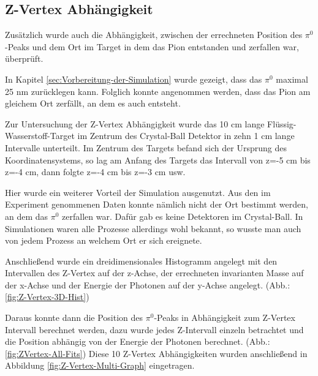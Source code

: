 \documentclass[a4paper,11pt,oneside,final,german,openbib,pdftex]{scrbook}
\begin{document}
{\subsection{Z-Vertex Abh\"angigkeit}
\label{sec:Z-Vertex-Abhaengigkeit}


Zusätzlich wurde auch die Abh\"angigkeit, zwischen der errechneten  Position des $\pi^0$-Peaks und dem Ort im Target in dem das Pion entstanden und zerfallen war, \"uberpr\"uft. 

In Kapitel \ref{sec:Vorbereitung-der-Simulation} wurde gezeigt, dass das $\pi^0$ maximal 25 nm zurücklegen kann. Folglich konnte angenommen werden, dass das Pion am gleichem Ort zerf\"allt, an dem es auch entsteht.

 
Zur Untersuchung der Z-Vertex Abhängigkeit wurde das 10 cm lange Fl\"ussig-Wasserstoff-Target im Zentrum des Crystal-Ball Detektor in zehn 1 cm lange Intervalle unterteilt. 
Im Zentrum des Targets befand sich der Ursprung des Koordinatensystems, so lag am Anfang des Targets das Intervall von z=-5 cm bis z=-4 cm, dann folgte z=-4 cm bis z=-3 cm usw. 

Hier wurde ein weiterer Vorteil der Simulation ausgenutzt. Aus den im Experiment genommenen Daten konnte n\"amlich nicht der Ort bestimmt werden, an dem das $\pi^0$ zerfallen war. Daf\"ur gab es keine Detektoren im Crystal-Ball. In Simulationen waren alle Prozesse allerdings wohl bekannt, so wusste man auch von jedem Prozess an welchem Ort er sich ereignete. 

Anschließend wurde ein dreidimensionales Histogramm angelegt mit den Intervallen des Z-Vertex auf der z-Achse, der errechneten invarianten Masse auf der x-Achse und der Energie der Photonen auf der y-Achse angelegt. (Abb.: \ref{fig:Z-Vertex-3D-Hist})

Daraus konnte dann die Position des $\pi^0$-Peaks in Abhängigkeit zum Z-Vertex Intervall berechnet werden, dazu wurde jedes Z-Intervall einzeln betrachtet und die Position abhängig von der Energie der Photonen berechnet. (Abb.: \ref{fig:ZVertex-All-Fits})
Diese 10 Z-Vertex Abhängigkeiten wurden anschließend in Abbildung \ref{fig:Z-Vertex-Multi-Graph} eingetragen.

}
\end{document}
